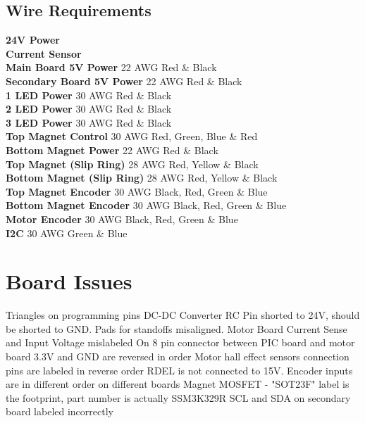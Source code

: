 \documentclass{article}
\begin{document}
\subsection{Wire Requirements}
\textbf{24V Power}\\
\textbf{Current Sensor}\\
\textbf{Main Board 5V Power} 22 AWG Red \& Black\\
\textbf{Secondary Board 5V Power} 22 AWG Red \& Black\\
\textbf{1 LED Power} 30 AWG Red \& Black\\
\textbf{2 LED Power} 30 AWG Red \& Black\\
\textbf{3 LED Power} 30 AWG Red \& Black\\
\textbf{Top Magnet Control} 30 AWG Red, Green, Blue \& Red\\
\textbf{Bottom Magnet Power} 22 AWG Red \& Black\\
\textbf{Top Magnet (Slip Ring)} 28 AWG Red, Yellow \& Black\\
\textbf{Bottom Magnet (Slip Ring)} 28 AWG Red, Yellow \& Black\\
\textbf{Top Magnet Encoder} 30 AWG Black, Red, Green \& Blue\\
\textbf{Bottom Magnet Encoder} 30 AWG Black, Red, Green \& Blue\\
\textbf{Motor Encoder} 30 AWG Black, Red, Green \& Blue\\
\textbf{I2C} 30 AWG Green \& Blue\\


\section{Board Issues}
Triangles on programming pins
DC-DC Converter
	RC Pin shorted to 24V, should be shorted to GND.
	Pads for standoffs misaligned.
Motor Board Current Sense and Input Voltage mislabeled
On 8 pin connector between PIC board and motor board 3.3V and GND are reversed in order
Motor hall effect sensors connection pins are labeled in reverse order
RDEL is not connected to 15V. 
Encoder inputs are in different order on different boards
Magnet MOSFET - "SOT23F" label is the footprint, part number is actually SSM3K329R
SCL and SDA on secondary board labeled incorrectly
\end{document}
